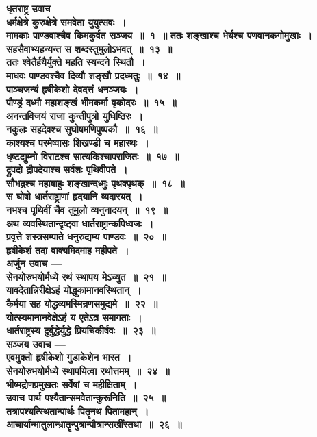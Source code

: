 \begin{center}{\bfseries धृतराष्ट्र उवाच —\\ धर्मक्षेत्रे कुरुक्षेत्रे समवेता युयुत्सवः~।\\मामकाः पाण्डवाश्चैव किमकुर्वत सञ्जय~॥~१~॥}
{\bfseries ततः शङ्खाश्च भेर्यश्च पणवानकगोमुखाः~।\\सहसैवाभ्यहन्यन्त स शब्दस्तुमुलोऽभवत्~॥~१३~॥}\\[10pt]
{\bfseries ततः श्वेतैर्हयैर्युक्ते महति स्यन्दने स्थितौ~।\\माधवः पाण्डवश्चैव दिव्यौ शङ्खौ प्रदध्मतुः~॥~१४~॥}\\[10pt]
{\bfseries पाञ्चजन्यं हृषीकेशो देवदत्तं धनञ्जयः~।\\पौण्ड्रं दध्मौ महाशङ्खं भीमकर्मा वृकोदरः~॥~१५~॥}\\[10pt]
{\bfseries अनन्तविजयं राजा कुन्तीपुत्रो युधिष्ठिरः~।\\नकुलः सहदेवश्च सुघोषमणिपुष्पकौ~॥~१६~॥}\\[10pt]
{\bfseries काश्यश्च परमेष्वासः शिखण्डी च महारथः~।\\धृष्टद्युम्नो विराटश्च सात्यकिश्चापराजितः~॥~१७~॥}\\[10pt]
{\bfseries द्रुपदो द्रौपदेयाश्च सर्वशः पृथिवीपते~।\\सौभद्रश्च महाबाहुः शङ्खान्दध्मुः पृथक्पृथक्~॥~१८~॥}\\[10pt]
{\bfseries स घोषो धार्तराष्ट्राणां हृदयानि व्यदारयत्~।\\नभश्च पृथिवीं चैव तुमुलो व्यनुनादयन्~॥~१९~॥}\\[10pt]
{\bfseries अथ व्यवस्थितान्दृष्ट्वा धार्तराष्ट्रान्कपिध्वजः~।\\प्रवृत्ते शस्त्रसम्पाते धनुरुद्यम्य पाण्डवः~॥~२०~॥}\\[10pt]
{\bfseries हृषीकेशं तदा वाक्यमिदमाह महीपते~।\\अर्जुन उवाच —\\सेनयोरुभयोर्मध्ये रथं स्थापय मेऽच्युत~॥~२१~॥}\\[10pt]
{\bfseries यावदेतान्निरीक्षेऽहं योद्धुकामानवस्थितान्~।\\कैर्मया सह योद्धव्यमस्मिन्रणसमुद्यमे~॥~२२~॥}\\[10pt]
{\bfseries योत्स्यमानानवेक्षेऽहं य एतेऽत्र समागताः~।\\धार्तराष्ट्रस्य दुर्बुद्धेर्युद्धे प्रियचिकीर्षवः~॥~२३~॥}\\[10pt]
{\bfseries सञ्जय उवाच —}\\ 
{\bfseries एवमुक्तो हृषीकेशो गुडाकेशेन भारत~।\\सेनयोरुभयोर्मध्ये स्थापयित्वा रथोत्तमम्~॥~२४~॥}\\[10pt]
{\bfseries भीष्मद्रोणप्रमुखतः सर्वेषां च महीक्षिताम्~।\\उवाच पार्थ पश्यैतान्समवेतान्कुरूनिति~॥~२५~॥}\\[10pt]
{\bfseries तत्रापश्यत्स्थितान्पार्थः पितॄनथ पितामहान्~।\\आचार्यान्मातुलान्भ्रातॄन्पुत्रान्पौत्रान्सखींस्तथा~॥~२६~॥}\\[10pt]

\end{center}
